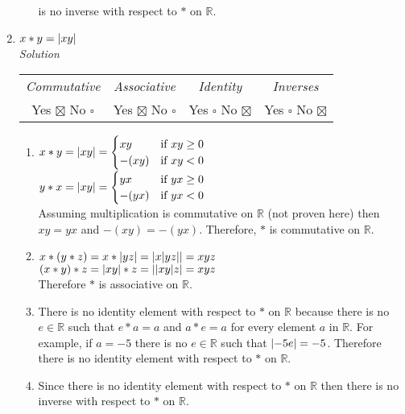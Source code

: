 \documentclass[12pt]{article}
\DeclarePairedDelimiter{\abs}{\lvert}{\rvert}
\begin{document}
\begin{flushleft}
\begin{enumerate}
\begin{enumerate}
                  is no inverse with respect to $*$ on $\mathbb{R}$.
              \end{enumerate}
          \item $x * y = \abs{ xy }$ \\
            \medskip
            \textit{Solution}
            \medskip
            \begin{tabular}{c c c c}
              \textit{Commutative} & \textit{Associative} & \textit{Identity} & \textit{Inverses} \\
              Yes $\boxtimes$ No $\square$ & Yes $\boxtimes$ No $\square$ & Yes $\square$ No $\boxtimes$ & Yes $\square$ No $\boxtimes$ \\
            \end{tabular}
            \begin{enumerate}
              \item $x * y = \abs{xy}  = \begin{cases} xy &\mbox{if } xy \geq 0 \\ -(xy) &\mbox{if } xy < 0\end{cases} $ \\
                $y * x = \abs{xy}  = \begin{cases} yx &\mbox{if } yx \geq 0 \\ -(yx) &\mbox{if } yx < 0\end{cases} $ \\
                Assuming multiplication is commutative on $\mathbb{R}$ (not proven here) then $xy = yx$ and $-(xy) = -(yx)$. 
                Therefore, $*$ is commutative on $\mathbb{R}$.
              \item $ x * (y * z) = x * \abs{yz} = \abs{x \abs{yz}} = xyz$ \\
                $ (x * y) * z = \abs{xy} * z = \abs{\abs{xy}z} = xyz$ \\
                Therefore $*$ is associative on $\mathbb{R}$.	
              \item There is no identity element with respect to $*$ on $\mathbb{R}$ because there is 
                no $e \in \mathbb{R}$ such that $e * a = a$ and $a * e = a$ for every element $a$ 
                in $\mathbb{R}$. For example, if $a = -5$ there is no $e \in \mathbb{R}$ such that 
                $\abs{-5e} = -5$. Therefore there is no identity element with respect to $*$ on $\mathbb{R}$. 
              \item Since there is no identity element with respect to $*$ on $\mathbb{R}$ then there is no inverse with respect to $*$ on $\mathbb{R}$.

\end{enumerate}
\end{enumerate}
\end{flushleft}
\end{document}
